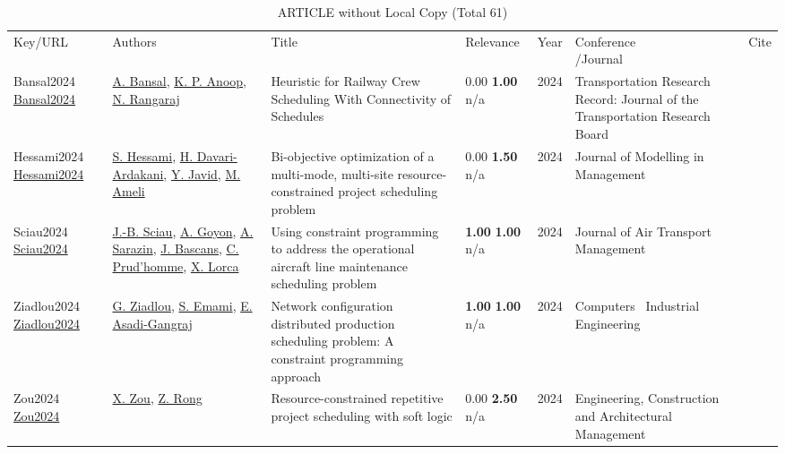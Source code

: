 {\scriptsize
\begin{longtable}{p{3cm}p{5cm}p{10cm}p{1cm}rp{2.5cm}l}
\rowcolor{white}\caption{ARTICLE without Local Copy (Total 61)}\\ \toprule
\rowcolor{white}Key/URL & Authors & Title & Relevance &Year & \shortstack{Conference\\/Journal} & Cite\\ \midrule
\endhead
\bottomrule
\endfoot
Bansal2024 \href{http://dx.doi.org/10.1177/03611981231223190}{Bansal2024} & \hyperref[auth:a2093]{A. Bansal}, \hyperref[auth:a2094]{K. P. Anoop}, \hyperref[auth:a2095]{N. Rangaraj} & Heuristic for Railway Crew Scheduling With Connectivity of Schedules & \noindent{}\textcolor{black!50}{0.00} \textbf{1.00} n/a & 2024 & Transportation Research Record: Journal of the Transportation Research Board & \cite{Bansal2024}\\
Hessami2024 \href{http://dx.doi.org/10.1108/jm2-06-2023-0123}{Hessami2024} & \hyperref[auth:a2086]{S. Hessami}, \hyperref[auth:a2087]{H. Davari-Ardakani}, \hyperref[auth:a2088]{Y. Javid}, \hyperref[auth:a2089]{M. Ameli} & Bi-objective optimization of a multi-mode, multi-site resource-constrained project scheduling problem & \noindent{}\textcolor{black!50}{0.00} \textbf{1.50} n/a & 2024 & Journal of Modelling in Management & \cite{Hessami2024}\\
Sciau2024 \href{http://dx.doi.org/10.1016/j.jairtraman.2024.102537}{Sciau2024} & \hyperref[auth:a2096]{J.-B. Sciau}, \hyperref[auth:a2097]{A. Goyon}, \hyperref[auth:a2098]{A. Sarazin}, \hyperref[auth:a2099]{J. Bascans}, \hyperref[auth:a1856]{C. Prud’homme}, \hyperref[auth:a244]{X. Lorca} & Using constraint programming to address the operational aircraft line maintenance scheduling problem & \noindent{}\textbf{1.00} \textbf{1.00} n/a & 2024 & Journal of Air Transport Management & \cite{Sciau2024}\\
Ziadlou2024 \href{http://dx.doi.org/10.1016/j.cie.2024.109916}{Ziadlou2024} & \hyperref[auth:a2090]{G. Ziadlou}, \hyperref[auth:a2091]{S. Emami}, \hyperref[auth:a2092]{E. Asadi-Gangraj} & Network configuration distributed production scheduling problem: A constraint programming approach & \noindent{}\textbf{1.00} \textbf{1.00} n/a & 2024 & Computers \  Industrial Engineering & \cite{Ziadlou2024}\\
Zou2024 \href{http://dx.doi.org/10.1108/ecam-08-2022-0703}{Zou2024} & \hyperref[auth:a755]{X. Zou}, \hyperref[auth:a2085]{Z. Rong} & Resource-constrained repetitive project scheduling with soft logic & \noindent{}\textcolor{black!50}{0.00} \textbf{2.50} n/a & 2024 & Engineering, Construction and Architectural Management & \cite{Zou2024}\\

\end{longtable}}
